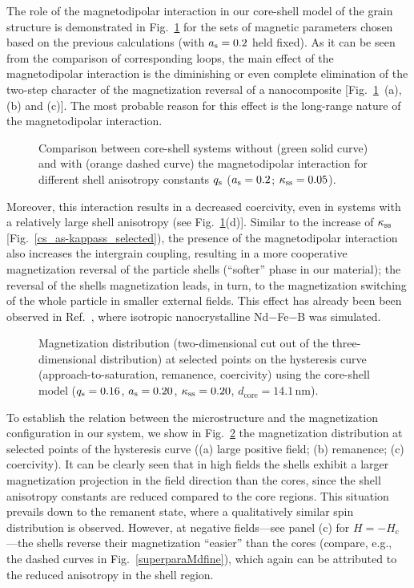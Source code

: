\documentclass[prm,twocolumn,showkeys,preprintnumbers,amsmath,amssymb,superscriptaddress,aps,10pt]{revtex4-1}
\begin{document}
The role of the magnetodipolar interaction in our core-shell model of the grain structure is demonstrated in Fig.~\ref{cs_qs-kappass_dipcomp} for the sets of magnetic parameters chosen based on the previous calculations (with $a_{\rm s} = 0.2$ held fixed). As it can be seen from the comparison of corresponding loops, the main effect of the magnetodipolar interaction is the diminishing or even complete elimination of the two-step character of the magnetization reversal of a nanocomposite [Fig.~\ref{cs_qs-kappass_dipcomp}~(a), (b) and (c)]. The most probable reason for this effect is the long-range nature of the magnetodipolar interaction.
\begin{figure}[htb]
\centering
{}
\caption{Comparison between core-shell systems without (green solid curve) and with (orange dashed curve) the magnetodipolar interaction for different shell anisotropy constants $q_{\rm s}$ ($a_{\rm s} = 0.2$; $\kappa_{\rm ss} = 0.05$).}
\label{cs_qs-kappass_dipcomp}
\end{figure}
Moreover, this interaction results in a decreased coercivity, even in systems with a relatively large shell anisotropy (see Fig.~\ref{cs_qs-kappass_dipcomp}(d)]. Similar to the increase of $\kappa_{\rm ss}$ [Fig.~\ref{cs_as-kappass_selected}), the presence of the magnetodipolar interaction also increases the intergrain coupling, resulting in a more cooperative magnetization reversal of the particle shells (``softer'' phase in our material); the reversal of the shells magnetization leads, in turn, to the magnetization switching of the whole particle in smaller external fields. This effect has already been been observed in Ref.~, where isotropic nanocrystalline Nd$-$Fe$-$B was simulated.

\begin{figure}[htb]
\centering
{}
\caption{Magnetization distribution (two-dimensional cut out of the three-dimensional distribution) at selected points on the hysteresis curve (approach-to-saturation, remanence, coercivity) using the core-shell model ($q_{\rm s} = 0.16$, $a_{\rm s} = 0.20$, $\kappa_{\rm ss} = 0.20$, $d_{\mathrm{core}} = 14.1 \, \mathrm{nm}$).}
\label{spintexture}
\end{figure}
To establish the relation between the microstructure and the magnetization configuration in our system, we show in Fig.~\ref{spintexture} the magnetization distribution at selected points of the hysteresis curve ((a) large positive field; (b) remanence; (c) coercivity). It can be clearly seen that in high fields the shells exhibit a larger magnetization projection in the field direction than the cores, since the shell anisotropy constants are reduced compared to the core regions. This situation prevails down to the remanent state, where a qualitatively similar spin distribution is observed. However, at negative fields---see panel (c) for $H = - H_{\mathrm{c}}$---the shells reverse their magnetization ``easier'' than the cores (compare, e.g., the dashed curves in Fig.~\ref{superparaMdfine}), which again can be attributed to the reduced anisotropy in the shell region.
\end{document}

